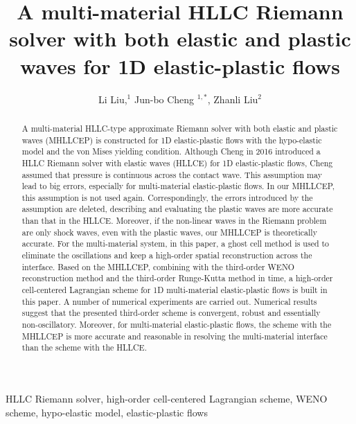 \documentclass[review]{elsarticle}
\begin{document}
\begin{frontmatter}

\title{A multi-material HLLC Riemann solver with both elastic and plastic waves for 1D  elastic-plastic flows}

\author{Li Liu,$^1$ Jun-bo Cheng $^{1,*}$, Zhanli Liu$^2$}


\address{$^1$  Institute of Applied Physics and Computational Mathematics, Beijing 100094, China }
\address{$^2$  Applied Mechanics Laboratory, Department of Engineering Mechanics, School of Aerospace, Tsinghua University, Beijing, China }

\begin{abstract}
  A multi-material HLLC-type  approximate Riemann solver with both elastic and plastic waves (MHLLCEP) is constructed for 1D elastic-plastic flows with the  hypo-elastic model and the von Mises yielding condition. Although Cheng in 2016 \cite{cheng2016harten} introduced a HLLC Riemann solver with elastic waves (HLLCE) for 1D elastic-plastic flows, Cheng assumed that pressure is continuous across the contact wave. This assumption may lead to big errors, especially for multi-material elastic-plastic flows. In our MHLLCEP, this assumption is not used again. Correspondingly, the errors introduced by the assumption are deleted, describing and evaluating the plastic waves are more accurate than that in the HLLCE. Moreover, if the non-linear waves in the Riemann problem are only shock waves, even with the plastic waves, our MHLLCEP is theoretically accurate. For  the multi-material system, in this paper, a ghost cell method is used to eliminate the  oscillations  and keep a high-order spatial reconstruction across the interface. Based on the MHLLCEP, combining with the third-order WENO reconstruction method and the third-order Runge-Kutta method in time, a high-order cell-centered Lagrangian scheme for 1D multi-material elastic-plastic flows is built in this paper. A number of numerical experiments are carried out. Numerical results suggest  that the presented third-order scheme is convergent, robust and essentially non-oscillatory. Moreover, for multi-material elastic-plastic flows, the scheme with  the MHLLCEP is more accurate and reasonable in resolving the multi-material interface than the scheme with the  HLLCE.
\end{abstract}

\begin{keyword}
  HLLC Riemann solver, high-order cell-centered Lagrangian scheme,  WENO scheme,  hypo-elastic model, elastic-plastic flows
\end{keyword}

\end{frontmatter}
\end{document}
